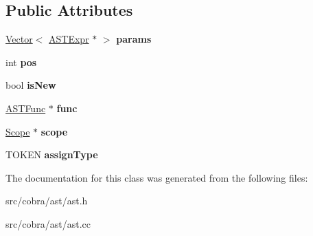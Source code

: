 \subsection*{Public Attributes}
\begin{DoxyCompactItemize}
\item 
\hypertarget{class_cobra_1_1internal_1_1_a_s_t_func_call_expr_aaa1d53dcaf464d2143e99442302b54a0}{\hyperlink{class_cobra_1_1internal_1_1_vector}{Vector}$<$ \hyperlink{class_cobra_1_1internal_1_1_a_s_t_expr}{A\+S\+T\+Expr} $\ast$ $>$ {\bfseries params}}\label{class_cobra_1_1internal_1_1_a_s_t_func_call_expr_aaa1d53dcaf464d2143e99442302b54a0}

\item 
\hypertarget{class_cobra_1_1internal_1_1_a_s_t_func_call_expr_ac2d3cd56d13cd40bae1eb030183e2d1f}{int {\bfseries pos}}\label{class_cobra_1_1internal_1_1_a_s_t_func_call_expr_ac2d3cd56d13cd40bae1eb030183e2d1f}

\item 
\hypertarget{class_cobra_1_1internal_1_1_a_s_t_func_call_expr_a5842d495d42a61e1504dec7ca8a8e4a5}{bool {\bfseries is\+New}}\label{class_cobra_1_1internal_1_1_a_s_t_func_call_expr_a5842d495d42a61e1504dec7ca8a8e4a5}

\item 
\hypertarget{class_cobra_1_1internal_1_1_a_s_t_func_call_expr_a2cbcc879dc96092f1a8a627d85524b69}{\hyperlink{class_cobra_1_1internal_1_1_a_s_t_func}{A\+S\+T\+Func} $\ast$ {\bfseries func}}\label{class_cobra_1_1internal_1_1_a_s_t_func_call_expr_a2cbcc879dc96092f1a8a627d85524b69}

\item 
\hypertarget{class_cobra_1_1internal_1_1_a_s_t_func_call_expr_a28afbf7c743500c44ca999c95f1f2346}{\hyperlink{class_cobra_1_1internal_1_1_scope}{Scope} $\ast$ {\bfseries scope}}\label{class_cobra_1_1internal_1_1_a_s_t_func_call_expr_a28afbf7c743500c44ca999c95f1f2346}

\item 
\hypertarget{class_cobra_1_1internal_1_1_a_s_t_func_call_expr_a5577b67ff18014be0f473adfb39eecb1}{T\+O\+K\+E\+N {\bfseries assign\+Type}}\label{class_cobra_1_1internal_1_1_a_s_t_func_call_expr_a5577b67ff18014be0f473adfb39eecb1}

\end{DoxyCompactItemize}


The documentation for this class was generated from the following files\+:\begin{DoxyCompactItemize}
\item 
src/cobra/ast/ast.\+h\item 
src/cobra/ast/ast.\+cc\end{DoxyCompactItemize}
